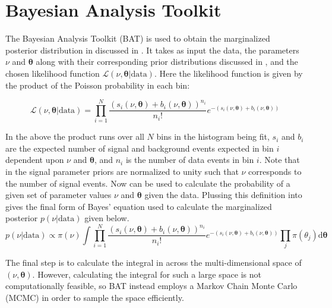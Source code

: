 \section{Bayesian Analysis Toolkit} \label{sec:fit:bat}

The Bayesian Analysis Toolkit (BAT) \cite{Beaujean:2011zz,Beresford:2642397} is
used to obtain the marginalized posterior distribution in 
discussed in .  It takes as input the data, the parameters
$\nu$ and $\boldsymbol{\theta}$ along with their corresponding prior
distributions discussed in , and the chosen likelihood
function $\mathcal{L}(\nu,\boldsymbol{\theta}|\text{data})$.  Here the
likelihood function is given by the product of the Poisson probability in each
bin: 

\begin{equation} \label{sec:fit:likelihood}
\mathcal{L}(\nu,\boldsymbol{\theta}|\text{data}) = \prod_{i=1}^{N} \frac{(s_{i}(\nu,\boldsymbol{\theta}) + b_{i}(\nu,\boldsymbol{\theta}))^{n_{i}}}{n_{i}!} e^{-(s_{i}(\nu,\boldsymbol{\theta}) + b_{i}(\nu,\boldsymbol{\theta}))}
\end{equation}

In the above the product runs over all $N$ bins in the histogram being fit,
$s_{i}$ and $b_{i}$ are the expected number of signal and background events
expected in bin $i$ dependent upon $\nu$ and $\boldsymbol{\theta}$, and $n_{i}$
is the number of data events in bin $i$.  Note that in 
the signal parameter priors are normalized to unity such that $\nu$ corresponds
to the number of signal events. Now  can be used to
calculate the probability of a given set of parameter values $\nu$ and
$\boldsymbol{\theta}$ given the data.  Plussing this definition into
 gives the final form of Bayes' equation used to
calculate the marginalized posterior $p(\nu|\text{data})$ given below.
%
\begin{equation} \label{sec:fit:full_bayes}
p(\nu|\text{data}) \propto \pi(\nu) \int \prod_{i=1}^{N} \frac{(s_{i}(\nu,\boldsymbol{\theta}) + b_{i}(\nu,\boldsymbol{\theta}))^{n_{i}}}{n_{i}!} e^{-(s_{i}(\nu,\boldsymbol{\theta}) + b_{i}(\nu,\boldsymbol{\theta}))} \prod_{j}\pi(\theta_j)\text{d}\boldsymbol{\theta}
\end{equation}

The final step is to calculate the integral in  across
the multi-dimensional space of $(\nu,\boldsymbol{\theta})$. However, calculating the
integral for such a large space is not computationally feasible, so BAT instead
employs a Markov Chain Monte Carlo (MCMC) \cite{2017arXiv170102434B,
Beresford:2642397} in order to sample the space efficiently.


